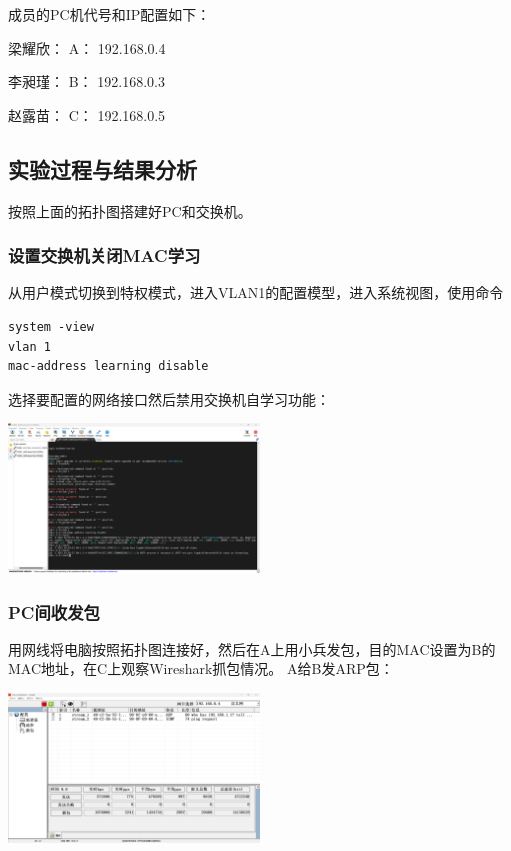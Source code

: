 \documentclass{article}
\begin{document}
成员的PC机代号和IP配置如下：

梁耀欣： A： 192.168.0.4

李昶瑾： B： 192.168.0.3

赵露苗： C： 192.168.0.5

\subsection{实验过程与结果分析}
按照上面的拓扑图搭建好PC和交换机。
\subsubsection{设置交换机关闭MAC学习}
从用户模式切换到特权模式，进入VLAN1的配置模型，进入系统视图，使用命令
\begin{lstlisting}
system -view
vlan 1
mac-address learning disable
\end{lstlisting}
选择要配置的网络接口然后禁用交换机自学习功能：
\begin{center}
    \includegraphics[width=0.5\textwidth]{2_2_images/10.png}
\end{center}
\vspace{10pt}

\subsubsection{PC间收发包}
用网线将电脑按照拓扑图连接好，然后在A上用小兵发包，目的MAC设置为B的MAC地址，在C上观察Wireshark抓包情况。
A给B发ARP包：
\begin{center}
    \includegraphics[width=0.5\textwidth]{2_2_images/11.png}
\end{center}
\vspace{10pt}
\end{document}
